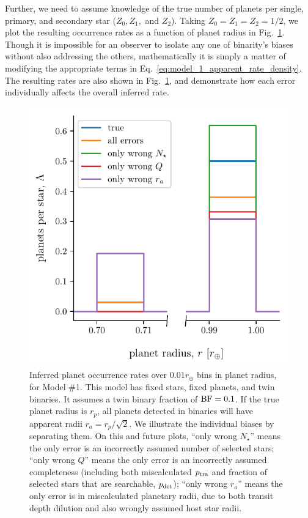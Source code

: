 Further, we need to assume knowledge of the true number of planets per 
single, primary, and secondary star ($Z_0,Z_1,$ and $Z_2$).
Taking $Z_0=Z_1=Z_2=1/2$, we plot the resulting occurrence rates as a function 
of planet radius in Fig.~\ref{fig:errcases_model_1}.
Though it is impossible for an observer to isolate any one of binarity's 
biases without also addressing the others, mathematically it is simply a 
matter of modifying the appropriate terms in 
Eq.~\ref{eq:model_1_apparent_rate_density}.
The resulting rates are also shown in 
Fig.~\ref{fig:errcases_model_1}, and demonstrate how each 
error individually affects the overall inferred rate.

\begin{figure}[!tb]
    \begin{center}
        \includegraphics[width=.6\textwidth]{figures/errcases_rate_density_vs_radius_model_1_brokenx.pdf}
    \end{center}
    \vspace{-0.5cm}
    \caption{
        Inferred planet occurrence rates over $0.01r_\oplus$ bins in planet 
        radius,
        for Model \#1.
        This model has fixed stars, fixed planets, and twin binaries. 
        It assumes a twin binary fraction of ${\rm BF}=0.1$.
        If the true planet radius is $r_p$, all planets 
        detected in binaries will have apparent radii $r_a = r_p/\sqrt{2}$.
        We illustrate the individual biases by separating them.
        On this and future plots,
        ``only wrong $N_\star$'' means the only error is an incorrectly 
        assumed 
        number of selected stars;
        ``only wrong $Q$'' means the only error is an incorrectly assumed 
        completeness (including both miscalculated $p_{\rm tra}$ 
        and fraction of selected stars that are searchable, $p_{\rm det}$);
        ``only wrong $r_a$'' means the only error is in miscalculated        
        planetary radii, due to both transit depth dilution and also wrongly 
        assumed host star radii.
    }
    \label{fig:errcases_model_1}
\end{figure}


